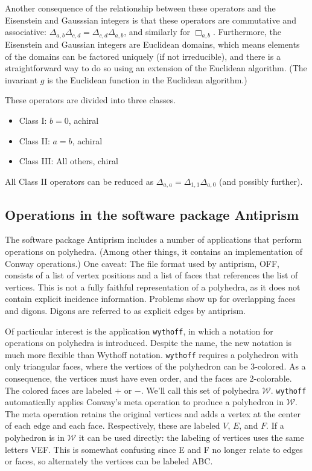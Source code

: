 \documentclass{article}
\begin{document}
Another consequence of the relationship between these operators and the
Eisenstein and Gausssian integers is that these operators are commutative and
associative: $\Delta_{a,b}\Delta_{c,d} = \Delta_{c,d}\Delta_{a,b}$, and
similarly for $\Box_{a,b}$. Furthermore, the Eisenstein and Gaussian integers
are Euclidean domains, which means elements of the domains can be factored
uniquely (if not irreducible), and there is a straightforward way to do so
using an extension of the Euclidean algorithm. (The invariant $g$ is the
Euclidean function in the Euclidean algorithm.)

These operators are divided into three classes.
\begin{itemize}
  \item Class I: $b = 0$, achiral
  \item Class II: $a = b$, achiral
  \item Class III: All others, chiral
\end{itemize}
All Class II operators can be reduced as
$\Delta_{a,a} = \Delta_{1,1}\Delta_{a,0}$ (and possibly further).

\subsection{Operations in the software package Antiprism}

The software package Antiprism \cite{antiprism} includes a number of
applications that perform operations on polyhedra. (Among other things, it
contains an implementation of Conway operations.) One caveat: The file format
used by antiprism, OFF, consists of a list of vertex positions and a list of
faces that references the list of vertices. This is not a fully faithful
representation of a polyhedra, as it does not contain explicit incidence
information. Problems show up for overlapping faces and digons. Digons are
referred to as explicit edges by antiprism.

Of particular interest is the application \texttt{wythoff}, in which a notation
for operations on polyhedra is introduced. Despite the name, the new notation is
much more flexible than Wythoff notation.
\texttt{wythoff} requires a polyhedron with only triangular faces, where the
vertices of the polyhedron can be 3-colored. As a consequence, the vertices must
have even order, and the faces are 2-colorable. The colored faces are labeled
$+$ or $-$. We'll call this set of polyhedra $\mathcal{W}$. \texttt{wythoff}
automatically applies Conway's meta operation to produce a polyhedron in
$\mathcal{W}$. The meta operation retains the original vertices and adds a
vertex at the center of each edge and each face. Respectively, these are labeled
$V$, $E$, and $F$. If a polyhedron is in $\mathcal{W}$ it can be used directly:
the labeling of vertices uses the same letters VEF. This is somewhat confusing since E and F no longer relate to edges or faces, so alternately the vertices
can be labeled ABC.
\end{document}
